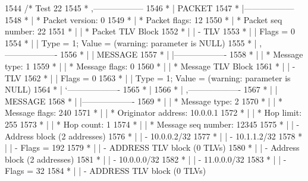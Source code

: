 \begin{DoxyCode}
1544   \textcolor{comment}{/* Test 22}
1545 \textcolor{comment}{         * ,------------------}
1546 \textcolor{comment}{         * |  PACKET}
1547 \textcolor{comment}{         * |------------------}
1548 \textcolor{comment}{         * | * Packet version:    0}
1549 \textcolor{comment}{         * | * Packet flags:  12}
1550 \textcolor{comment}{         * | * Packet seq number: 22}
1551 \textcolor{comment}{         * |    | * Packet TLV Block}
1552 \textcolor{comment}{         * |    |     - TLV}
1553 \textcolor{comment}{         * |    |         Flags = 0}
1554 \textcolor{comment}{         * |    |         Type = 1; Value = (warning: parameter is NULL)}
1555 \textcolor{comment}{         * |    ,-------------------}
1556 \textcolor{comment}{         * |    |  MESSAGE}
1557 \textcolor{comment}{         * |    |-------------------}
1558 \textcolor{comment}{         * |    | * Message type:       1}
1559 \textcolor{comment}{         * |    | * Message flags:  0}
1560 \textcolor{comment}{         * |    | * Message TLV Block}
1561 \textcolor{comment}{         * |    |     - TLV}
1562 \textcolor{comment}{         * |    |         Flags = 0}
1563 \textcolor{comment}{         * |    |         Type = 1; Value = (warning: parameter is NULL)}
1564 \textcolor{comment}{         * |    `-------------------}
1565 \textcolor{comment}{         * |}
1566 \textcolor{comment}{         * |    ,-------------------}
1567 \textcolor{comment}{         * |    |  MESSAGE}
1568 \textcolor{comment}{         * |    |-------------------}
1569 \textcolor{comment}{         * |    | * Message type:       2}
1570 \textcolor{comment}{         * |    | * Message flags:  240}
1571 \textcolor{comment}{         * |    | * Originator address: 10.0.0.1}
1572 \textcolor{comment}{         * |    | * Hop limit:          255}
1573 \textcolor{comment}{         * |    | * Hop count:          1}
1574 \textcolor{comment}{         * |    | * Message seq number: 12345}
1575 \textcolor{comment}{         * |    | - Address block (2 addresses)}
1576 \textcolor{comment}{         * |    |     - 10.0.0.2/32}
1577 \textcolor{comment}{         * |    |     - 10.1.1.2/32}
1578 \textcolor{comment}{         * |    |     - Flags = 192}
1579 \textcolor{comment}{         * |    | - ADDRESS TLV block (0 TLVs)}
1580 \textcolor{comment}{         * |    | - Address block (2 addresses)}
1581 \textcolor{comment}{         * |    |     - 10.0.0.0/32}
1582 \textcolor{comment}{         * |    |     - 11.0.0.0/32}
1583 \textcolor{comment}{         * |    |     - Flags = 32}
1584 \textcolor{comment}{         * |    | - ADDRESS TLV block (0 TLVs)}

\end{DoxyCode}
